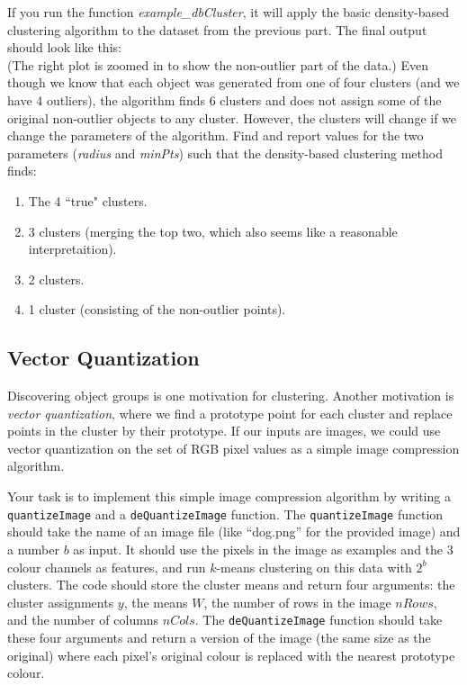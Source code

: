 \documentclass{article}
\def\blu#1{{\color{blu}#1}}
\newcommand{\fig}[2]{\texttt{[image: a2f/\#2]}}
\def\enum#1{\begin{enumerate}#1\end{enumerate}}
\begin{document}
If you run the function \emph{example\_dbCluster}, it will apply the basic density-based clustering algorithm to the dataset from the previous part. The final output should look like this:\\
(The right plot is zoomed in to show the non-outlier part of the data.)
Even though we know that each object was generated from one of four clusters (and we have 4 outliers), the algorithm finds 6 clusters and does not assign some of the original non-outlier objects to any cluster. However, the clusters will change if we change the parameters of the algorithm. Find and report values for the two parameters (\emph{radius} and \emph{minPts}) such that the density-based clustering method finds:
\blu{\enum{
\item The 4 ``true" clusters.
\item 3 clusters (merging the top two, which also seems like a reasonable interpretaition).
\item 2 clusters.
\item 1 cluster (consisting of the non-outlier points).
}
}

\subsection{Vector Quantization}


Discovering object groups is one motivation for clustering. Another motivation is \emph{vector quantization}, where we find a prototype point for each cluster and replace points in the cluster by their prototype. If our inputs are images, we could use vector quantization on the set of RGB pixel values as a simple image compression algorithm.

Your task is to implement this simple image compression algorithm by writing a \texttt{quantizeImage} and a \texttt{deQuantizeImage} function. The \texttt{quantizeImage} function should take the name of an image file (like ``dog.png'' for the provided image) and a number $b$ as input. It should use the pixels in the image as examples and the 3 colour channels as features, and run $k$-means clustering on this data with $2^b$ clusters. The code should store the cluster means and return four arguments: the cluster assignments $y$, the means $W$, the number of rows in the image $nRows$, and the number of columns $nCols$. The \texttt{deQuantizeImage} function should take these four arguments and return a version of the image (the same size as the original) where each pixel's original colour is replaced with the nearest prototype colour. 
\end{document}
